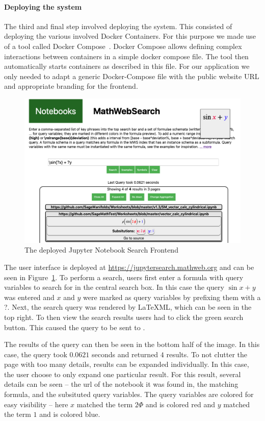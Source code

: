 \paragraph{Deploying the system}

The third and final step involved deploying the system.
This consisted of deploying the various involved Docker Containers. 
For this purpose we made use of a tool called Docker Compose~\cite{docker-compose:on}. 
Docker Compose allows defining complex interactions between containers in a simple docker compose file. 
The tool then automatically starts containers as described in this file. 
For our \MWS application we only needed to adapt a generic \MWS Docker-Compose file with the public website URL and appropriate branding for the frontend. 

\begin{figure}[ht]
  \includegraphics[width=\textwidth]{mwsnotebookfront.png}
  \caption{The deployed Jupyter Notebook Search Frontend}\label{fig:mwsnotebookfront}
\end{figure}

The user interface is deployed at \url{https://jupytersearch.mathweb.org} and can be seen in Figure~\ref{fig:mwsnotebookfront}.
To perform a search, users first enter a formula with query variables to search for in the central search box. 
In this case the query $\sin{x} + y$ was entered and $x$ and $y$ were marked as query variables by prefixing them with a ?. 
Next, the search query was rendered by {\LaTeX}ML, which can be seen in the top right. 
To then view the search results users had to click the green search button. 
This caused the query to be sent to \MWS. 

The results of the query can then be seen in the bottom half of the image.
In this case, the query took $0.0621$ seconds and returned $4$ results. 
To not clutter the page with too many details, results can be expanded individually. 
In this case, the user choose to only expand one particular result. 
For this result, several details can be seen -- the url of the notebook it was found in, the matching formula, and the subsituted query variables. 
The query variables are colored for easy visibility -- here $x$ matched the term $2\Phi$ and is colored red and $y$ matched the term $1$ and is colored blue. 

